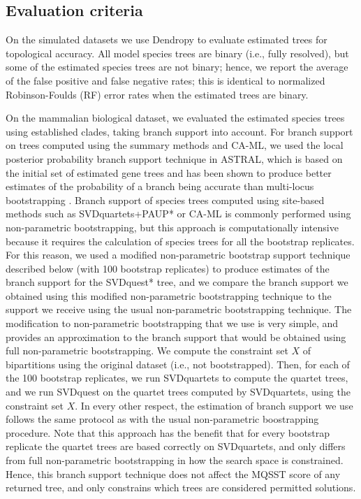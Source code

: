 \subsection{Evaluation criteria}
On the simulated datasets we  use Dendropy \cite{dendropy} to evaluate estimated trees  for topological accuracy.
All model species trees are binary (i.e.,  fully resolved), but some of the estimated
species trees are not binary; hence, 
we report  the average of the false positive and false negative
rates; this is identical to normalized Robinson-Foulds (RF) error rates \cite{robinson1981comparison} when the estimated trees are binary. 

On the mammalian biological dataset, we evaluated the estimated species trees using established clades, taking branch support  into account.
For branch support on trees computed using the summary methods and CA-ML, we used the local  posterior probability branch support technique  \cite{sayyari2016fast}  in ASTRAL, which is based on the initial set of estimated gene trees and has been shown to produce better estimates of the probability of a branch being accurate than multi-locus bootstrapping  \cite{sayyari2016fast}.
Branch support of species trees computed using site-based methods such as SVDquartets+PAUP* or CA-ML is  commonly performed using
non-parametric bootstrapping, but  this approach is  computationally intensive because  it requires the 
calculation of species trees for all the bootstrap replicates. 
For this reason, we used a modified non-parametric bootstrap support technique described below (with 100 bootstrap replicates) to produce estimates of the branch support for the SVDquest* tree, and
we compare the branch support we obtained using this modified non-parametric bootstrapping technique to the support we receive using the usual non-parametric bootstrapping
technique.
The modification to non-parametric bootstrapping that we use is very simple, and provides an approximation to the branch support that would be obtained using full non-parametric bootstrapping.
We compute the constraint set $X$ of bipartitions  using  the original dataset (i.e., not bootstrapped).  Then, for each of the 100 bootstrap replicates,  we run 
SVDquartets  to compute the quartet trees, and we
 run SVDquest on the quartet trees computed by SVDquartets, using the constraint set $X$.
In every other respect, the estimation of branch support we use follows the same protocol as with the usual non-parametric boostrapping procedure.
Note that this approach has the benefit  that for every bootstrap replicate the quartet trees are based correctly on SVDquartets,  and only differs from full non-parametric bootstrapping in how the search space is constrained.
Hence, this branch support technique  does not affect the MQSST score of any returned tree, and only constrains which trees are considered permitted solutions. 

